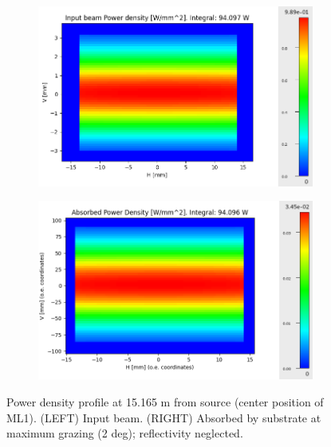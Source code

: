\begin{figure}[ht]  %
\begin{subfigure}{0.5\textwidth}
\includegraphics[width=\linewidth]{./../../power_profiles/power_profile_ML1.png}
\end{subfigure}
\hfill %
\begin{subfigure}{0.5\textwidth}
\includegraphics[width=\linewidth]{./../../power_profiles/power_profile_ML1_abs_2deg.png}
\end{subfigure}
\caption{\label{fig:power_profile_ML1} Power density profile at 15.165 m from source (center position of ML1). (LEFT) Input beam. (RIGHT) Absorbed by substrate at maximum grazing (2 deg); reflectivity neglected. }
\end{figure}

